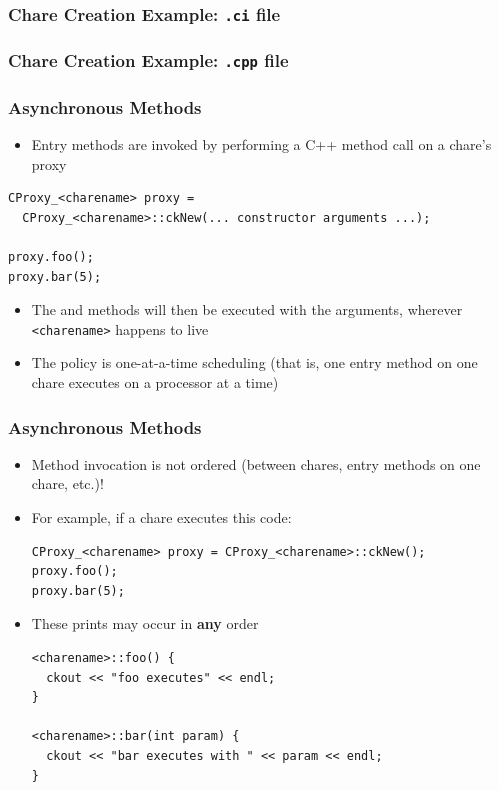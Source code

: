 \begin{frame}[fragile]
  \frametitle{Chare Creation Example: \texttt{.ci} file}
  
\end{frame}

\begin{frame}[fragile]
  \frametitle{Chare Creation Example: \texttt{.cpp} file}
  
\end{frame}

\begin{frame}[fragile]
  \frametitle{Asynchronous Methods}
  \begin{itemize}
  \item Entry methods are invoked by performing a C++ method call on a chare's
    proxy
  \end{itemize}
  \begin{lstlisting}
CProxy_<charename> proxy =
  CProxy_<charename>::ckNew(... constructor arguments ...);

proxy.foo();
proxy.bar(5);
\end{lstlisting}
\begin{itemize}
\item The  and  methods will then be executed with the
  arguments, wherever \texttt{<charename>} happens to live
\item The policy is one-at-a-time scheduling (that is, one entry method on one
  chare executes on a processor at a time)
\end{itemize}
\end{frame}

\begin{frame}[fragile]
  \frametitle{Asynchronous Methods}
  \begin{itemize}
  \item Method invocation is not ordered (between chares, entry methods on one
    chare, etc.)!
  \item For example, if a chare executes this code:
  \begin{lstlisting}
CProxy_<charename> proxy = CProxy_<charename>::ckNew();
proxy.foo();
proxy.bar(5);
  \end{lstlisting}
  \item These prints may occur in \textbf{any} order
  \begin{lstlisting}
<charename>::foo() {
  ckout << "foo executes" << endl;
}

<charename>::bar(int param) {
  ckout << "bar executes with " << param << endl;
}
\end{lstlisting}
  \end{itemize}
\end{frame}


